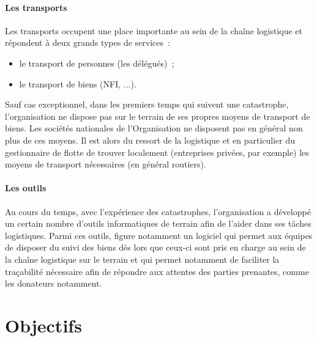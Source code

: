 \paragraph{Les transports}
Les transports occupent une place importante au sein de la chaîne logistique et répondent à deux grands types de services~:
\begin{itemize}
	\item le transport de personnes (les délégués)~;
	\item le transport de biens (NFI, ...).
\end{itemize}
Sauf cas exceptionnel, dans les premiers temps qui suivent une catastrophe, l'organisation ne dispose pas sur le terrain de ses propres moyens de transport de biens. Les sociétés nationales de l'Organisation ne disposent pas en général non plus de ces moyens. Il est alors du ressort de la logistique et en particulier du gestionnaire de flotte de trouver localement (entreprises privées, par exemple) les moyens de transport nécessaires (en général routiers).

\paragraph{Les outils}
Au cours du temps, avec l'expérience des catastrophes, l'organisation a développé un certain nombre d'outils informatiques de terrain afin de l'aider dans ses tâches logistiques. Parmi ces outils, figure notamment un logiciel qui permet aux équipes de disposer du suivi des biens dès lors que ceux-ci sont pris en charge au sein de la chaîne logistique sur le terrain et qui permet notamment de faciliter la traçabilité nécessaire afin de répondre aux attentes des parties prenantes, comme les donateurs notamment.

\section{Objectifs}

